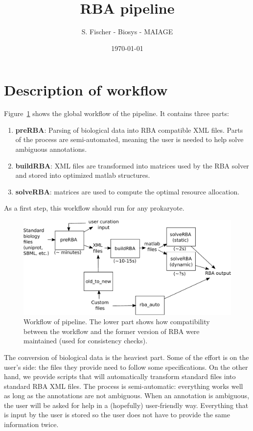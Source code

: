 \documentclass[12pt]{scrartcl}
\newcommand\reft[3][]{#2~\ref{#3}#1}
\theoremstyle{definition}
\theoremstyle{remark}
\numberwithin{equation}{section}
\newcommand\reffigt[2][]{\reft[#1]{Figure}{#2}}
\begin{document}
\title{RBA pipeline}%
\author{S. Fischer - Biosys - MAIAGE}%
\date{\today}%

\maketitle

\newpage

\tableofcontents

\newpage

\section{Description of workflow}

\reffigt{fig:workflow} shows the global workflow of the pipeline. It contains three parts:
\begin{enumerate}
\item \textbf{preRBA}: Parsing of biological data into RBA compatible XML files. Parts of the process are semi-automated, meaning the user is needed to help solve ambiguous annotations.
\item \textbf{buildRBA}: XML files are transformed into matrices used by the RBA solver and stored into optimized matlab structures.
\item \textbf{solveRBA}: matrices are used to compute the optimal resource allocation.
\end{enumerate}
As a first step, this workflow should run for any prokaryote.

\begin{figure}[ht]
  \centering
  \includegraphics[width=\linewidth]{workflow}
  \caption{Workflow of pipeline. The lower part shows how compatibility between the workflow and the former version of RBA were maintained (used for consistency checks).}
  \label{fig:workflow}
\end{figure}

The conversion of biological data is the heaviest part. Some of the effort is on the user's side: the files they provide need to follow some specifications. On the other hand, we provide scripts that will automatically transform standard files into standard RBA XML files. The process is semi-automatic: everything works well as long as the annotations are not ambiguous. When an annotation is ambiguous, the user will be asked for help in a (hopefully) user-friendly way. Everything that is input by the user is stored so the user does not have to provide the same information twice.
\end{document}
